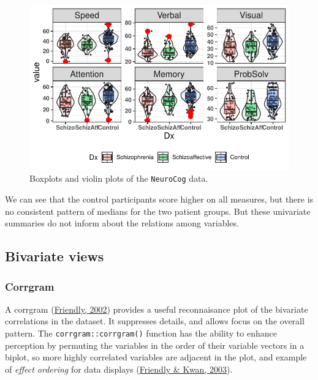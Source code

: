 \documentclass[
  letterpaper,
  10pt,
  krantz2]{krantz}
\begin{document}
\begin{figure}[H]

{\centering \includegraphics[width=1.2\textwidth,height=\textheight]{figs/fig-NC-boxplot-1.pdf}

}

\caption{\label{fig-NC-boxplot}Boxplots and violin plots of the
\texttt{NeuroCog} data.}

\end{figure}

We can see that the control participants score higher on all measures,
but there is no consistent pattern of medians for the two patient
groups. But these univariate summaries do not inform about the relations
among variables.

\hypertarget{bivariate-views}{%
\subsection{Bivariate views}\label{bivariate-views}}

\hypertarget{corrgram}{%
\subsubsection*{Corrgram}\label{corrgram}}

A corrgram (\protect\hyperlink{ref-Friendly:02:corrgram}{Friendly,
2002}) provides a useful reconnaisance plot of the bivariate
correlations in the dataset. It suppresses details, and allows focus on
the overall pattern. The \texttt{corrgram::corrgram()} function has the
ability to enhance perception by permuting the variables in the order of
their variable vectors in a biplot, so more highly correlated variables
are adjacent in the plot, and example of \emph{effect ordering} for data
displays (\protect\hyperlink{ref-FriendlyKwan:03:effect}{Friendly \&
Kwan, 2003}).
\end{document}
